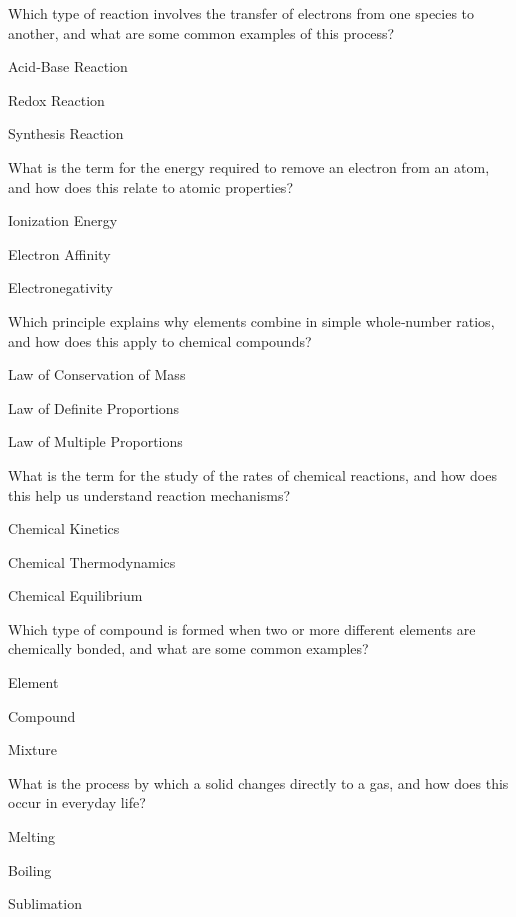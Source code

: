 \begin{enhancedmcq}{Which type of reaction involves the transfer of electrons from one species to another, and what are some common examples of this process?}
\item Acid‑Base Reaction
\item Redox Reaction
\item Synthesis Reaction

\end{enhancedmcq}
\begin{enhancedmcq}{What is the term for the energy required to remove an electron from an atom, and how does this relate to atomic properties?}
\item Ionization Energy
\item Electron Affinity
\item Electronegativity

\end{enhancedmcq}
\begin{enhancedmcq}{Which principle explains why elements combine in simple whole‑number ratios, and how does this apply to chemical compounds?}
\item Law of Conservation of Mass
\item Law of Definite Proportions
\item Law of Multiple Proportions

\end{enhancedmcq}
\begin{enhancedmcq}{What is the term for the study of the rates of chemical reactions, and how does this help us understand reaction mechanisms?}
\item Chemical Kinetics
\item Chemical Thermodynamics
\item Chemical Equilibrium

\end{enhancedmcq}
\begin{enhancedmcq}{Which type of compound is formed when two or more different elements are chemically bonded, and what are some common examples?}
\item Element
\item Compound
\item Mixture

\end{enhancedmcq}
\begin{enhancedmcq}{What is the process by which a solid changes directly to a gas, and how does this occur in everyday life?}
\item Melting
\item Boiling
\item Sublimation

\end{enhancedmcq}
